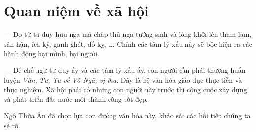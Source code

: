 \section{Quan niệm về xã hội} %
\label{sec:23_xa_hoi}

--- Do từ tư duy hữu ngã mà chấp thủ ngã tướng sinh và lòng khởi lên tham lam, sân hận, ích kỷ, ganh ghét, đố kỵ, \ldots. Chính các tâm lý xấu này sẽ bộc hiện ra các hành động hại mình, hại người.

--- Để chế ngự tư duy ấy và các tâm lý xấu ấy, con người cần phải thường huấn luyện \emph{Văn, Tư, Tu về Vô Ngã, vị tha}. Đây là hệ văn hóa giáo dục thực tiễn và thực nghiệm. Xã hội phải có những con người này trước thì công cuộc xây dựng và phát triển đất nước mới thành công tốt đẹp.

Ngô Thừa Ân đã chọn lựa con đường văn hóa này, khảo sát các hồi tiếp chúng ta sẽ rõ.
